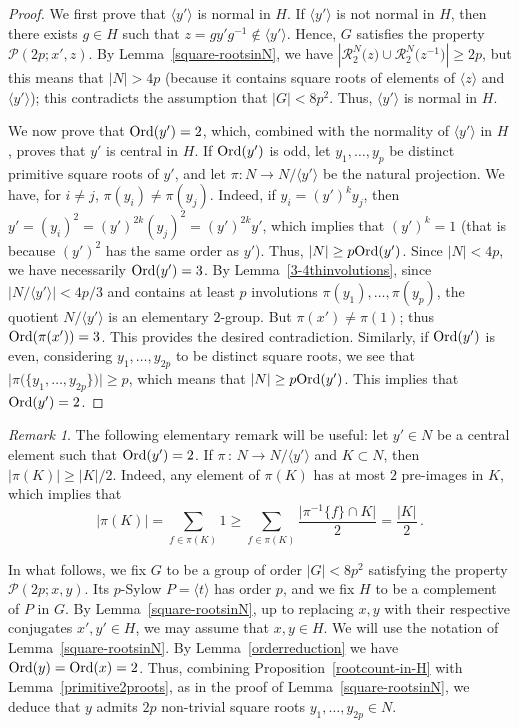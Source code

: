 \documentclass[12pt]{amsart}
\numberwithin{equation}{section}
\newcommand{\Ord}{{\rm Ord}}
\theoremstyle{definition}
\theoremstyle{remark}
\newtheorem{rk}{Remark}[section]
\begin{document}
\begin{proof}
    We first prove that $\langle y'\rangle$ is normal in $H$. If $\langle y'\rangle$ is not normal in $H$, then there exists $g\in H$ such that $z=gy'g^{-1}\notin \langle y'\rangle$. Hence, $G$ satisfies the property $\mathcal{P}(2p;x',z)$. By Lemma~\ref{square-rootsinN}, we have $\left| \mathcal{R}_2^N\bigl(z\bigr)\cup \mathcal{R}_2^N\bigl( z^{-1}\bigr) \right| \ge 2p$, but this means that $|N|>4p $ (because it contains square roots of elements of $\langle z\rangle$ and $\langle y'\rangle$); this contradicts the assumption that $|G|<8p^2$. Thus, $\langle y'\rangle$ is normal in $H$.
    
    We now prove that $\Ord(y')=2$, which, combined with the normality of $\langle y'\rangle $ in $H$, proves that $y'$ is central in $H$. If $\Ord(y')$ is odd, let $y_1,\dots,y_p$ be distinct primitive square roots of $y'$, and let $\pi:N\to N/\langle y'\rangle$ be the natural projection. We have, for $i\ne j$, $\pi(y_i)\ne \pi(y_j)$. Indeed, if $y_i=(y')^k y_j $, then $y'=(y_i)^2=(y')^{2k}(y_j)^2=(y')^{2k}y'$, which implies that $(y')^{k}=1$ (that is because $(y')^2$ has the same order as $y'$). Thus, $|N|\ge p \Ord(y')$. Since $|N|<4p$, we have necessarily $\Ord(y')=3$. By Lemma~\ref{3-4thinvolutions}, since $\bigl |N/\langle y'\rangle\bigr|< 4p/3$ and contains at least $p$ involutions $\pi(y_1),\dots,\pi(y_p)$, the quotient $N/\langle y'\rangle$ is an elementary $2$-group. But $\pi(x')\ne \pi(1)$; thus $\Ord(\pi(x'))=3$. This provides the desired contradiction.
    Similarly, if $\Ord(y')$ is even, considering $y_1,\dots,y_{2p}$ to be distinct square roots, we see that $\bigl| \pi\bigl(\{y_1,\dots,y_{2p}\}\bigr)\bigr|\ge p$, which means that $|N|\ge p\Ord(y')$. This implies that $\Ord(y')=2$.
\end{proof}
\begin{rk}
The following elementary remark will be useful: let $y'\in N$ be a central element such that $\Ord(y')=2$. If $\pi\, \colon\, N\to N/\langle y'\rangle$ and $K\subset N$, then $|\pi(K)|\ge |K|/2$. Indeed, any element of $\pi(K)$ has at most $2$ pre-images in $K$, which implies that \[ |\pi(K)|=\sum_{f\in \pi(K)} 1\ge \sum_{f\in\pi(K)}\frac{\bigl|\pi^{-1}\{f\}\cap K\bigr|}{2}=\frac{|K|}{2}\, . \]
\end{rk}
In what follows, we fix $G$ to be a group of order $|G|<8p^2$ satisfying the property $\mathcal{P}(2p;x,y)$. Its $p$-Sylow $P=\langle t\rangle$ has order $p$, and we fix $H$ to be a complement of $P$ in $G$. By Lemma~\ref{square-rootsinN}, up to replacing $x,y$ with their respective conjugates $x',y'\in H$, we may assume that $x,y\in H$. We will use the notation of Lemma~\ref{square-rootsinN}. By Lemma~\ref{orderreduction} we have $\Ord(y)=\Ord(x)=2$. Thus, combining Proposition~\ref{rootcount-in-H} with Lemma~\ref{primitive2proots}, as in the proof of Lemma~\ref{square-rootsinN}, we deduce that $y$ admits $2p$ non-trivial square roots $y_1,\dots,y_{2p}\in N$. 
\end{document}
